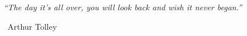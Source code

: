 \begin{center}
\fontsize{16}{20}\selectfont %
\itshape %
“The day it's all over, you will look back and wish it never began.”
\end{center}

\vspace{1em} %

\begin{flushright}
\fontsize{12}{14}\selectfont %
\textemdash\ Arthur Tolley
\end{flushright}

\vfill
\null
\clearpage
